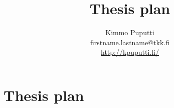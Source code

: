 \documentclass[a4paper,12pt]{article}
\title{Thesis plan}
\author{Kimmo Puputti\\firstname.lastname@tkk.fi\\\url{http://kpuputti.fi/}}
\begin{document}
\maketitle
\thispagestyle{empty}
\setcounter{page}{0}
\clearpage

\section{Thesis plan}
\end{document}
